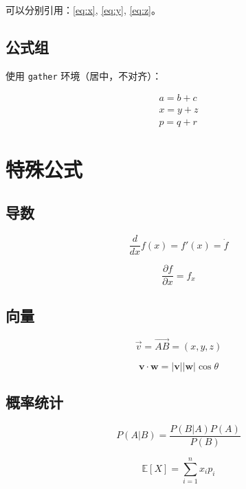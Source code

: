 可以分别引用：\eqref{eq:x}, \eqref{eq:y}, \eqref{eq:z}。

\subsection{公式组}

使用 \texttt{gather} 环境（居中，不对齐）：

\begin{gather}
  a = b + c \\
  x = y + z \\
  p = q + r
\end{gather}

\section{特殊公式}

\subsection{导数}

\begin{equation}
  \frac{d}{dx}f(x) = f'(x) = \dot{f}
\end{equation}

\begin{equation}
  \frac{\partial f}{\partial x} = f_x
\end{equation}

\subsection{向量}

\begin{equation}
  \vec{v} = \overrightarrow{AB} = (x, y, z)
\end{equation}

\begin{equation}
  \mathbf{v} \cdot \mathbf{w} = |\mathbf{v}| |\mathbf{w}| \cos\theta
\end{equation}

\subsection{概率统计}

\begin{equation}
  P(A|B) = \frac{P(B|A)P(A)}{P(B)}
\end{equation}

\begin{equation}
  \mathbb{E}[X] = \sum_{i=1}^{n} x_i p_i
\end{equation}

